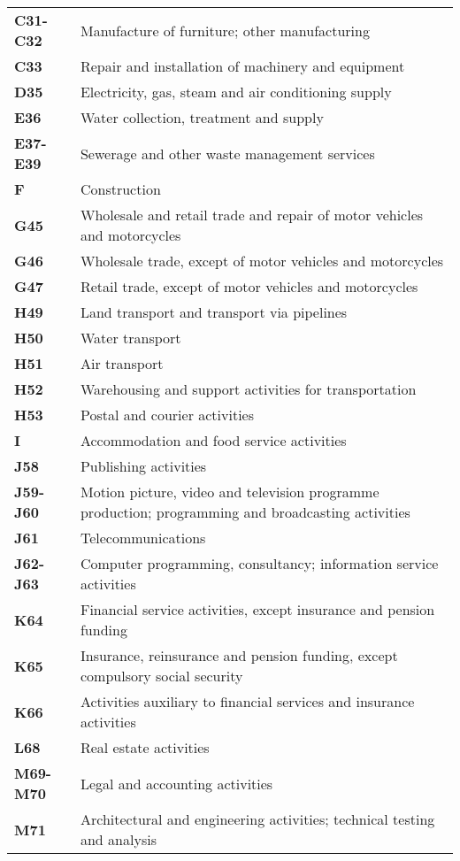 \documentclass[11pt,a4paper]{article}
\begin{document}
\begin{table}[!h]
\begin{tabular}{ll}
\textbf{C31-C32} &{Manufacture of furniture; other manufacturing}\\
\textbf{C33} &{Repair and installation of machinery and equipment}\\
\textbf{D35} &{Electricity, gas, steam and air conditioning supply}\\
\textbf{E36} &{Water collection, treatment and supply}\\
\textbf{E37-E39} &{Sewerage and other waste management services}\\
\textbf{F} &{Construction}\\
\textbf{G45} &{Wholesale and retail trade and repair of motor vehicles and motorcycles}\\
\textbf{G46} &{Wholesale trade, except of motor vehicles and motorcycles}\\
\textbf{G47} &{Retail trade, except of motor vehicles and motorcycles}\\
\textbf{H49} &{Land transport and transport via pipelines}\\
\textbf{H50} &{Water transport}\\
\textbf{H51} &{Air transport}\\
\textbf{H52} &{Warehousing and support activities for transportation}\\
\textbf{H53} &{Postal and courier activities}\\
\textbf{I} &{Accommodation and food service activities}\\
\textbf{J58} &{Publishing activities}\\
\textbf{J59-J60} &{Motion picture, video and television programme production; programming and broadcasting activities}\\
\textbf{J61} &{Telecommunications}\\
\textbf{J62-J63} &{Computer programming, consultancy; information service activities}\\
\textbf{K64} &{Financial service activities, except insurance and pension funding}\\
\textbf{K65} &{Insurance, reinsurance and pension funding, except compulsory social security}\\
\textbf{K66} &{Activities auxiliary to financial services and insurance activities}\\
\textbf{L68} &{Real estate activities}\\
\textbf{M69-M70} &{Legal and accounting activities}\\
\textbf{M71} &{Architectural and engineering activities; technical testing and analysis}\\

\end{tabular}
\end{table}
\end{document}
